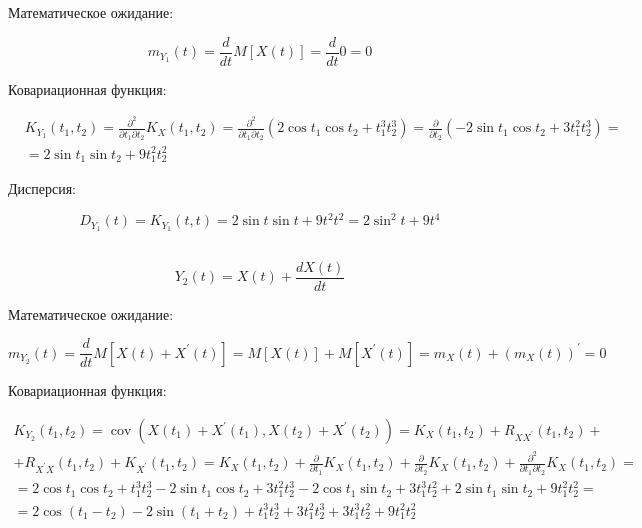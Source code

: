 \documentclass[12 pt]{article}
\begin{document}
Математическое ожидание:

\begin{equation}
	m_{Y_{1}}(t)=\frac{d}{d t} M[X(t)]=\frac{d}{d t} 0=0
\end{equation}


Ковариационная функция:

\begin{align*}
	&K_{Y_{1}}\left(t_{1}, t_{2}\right)=\frac{\partial^{2}}{\partial t_{1} \partial t_{2}} K_{X}\left(t_{1}, t_{2}\right)=\frac{\partial^{2}}{\partial t_{1} \partial t_{2}}\left(2 \cos t_{1} \cos t_{2}+t_{1}^{3} t_{2}^{3}\right)=\frac{\partial}{\partial t_{2}}\left(-2 \sin t_{1} \cos t_{2}+3 t_{1}^{2} t_{2}^{3}\right)= \\
	&=2 \sin t_{1} \sin t_{2}+9 t_{1}^{2} t_{2}^{2}
\end{align*}


Дисперсия:

\begin{equation}
	D_{Y_{1}}(t)=K_{Y_{1}}(t, t)=2 \operatorname{sin}t\operatorname{sin}t+9 t^{2} t^{2}=2 \sin ^{2} t+9 t^{4}
\end{equation}


\newpage
\subsection{}

\begin{equation}
	Y_2(t) = X(t) + \frac{dX(t)}{dt}
\end{equation}

Математическое ожидание:

\begin{equation}
	m_{Y_{2}}(t)=\frac{d}{d t} M\left[X(t)+X^{\prime}(t)\right]=M[X(t)]+M\left[X^{\prime}(t)\right]=m_{X}(t)+\left(m_{X}(t)\right)^{\prime}=0
\end{equation}


Ковариационная функция:

\begin{equation}
	\begin{array}{l}
	K_{Y_{2}}\left(t_{1}, t_{2}\right)=\operatorname{cov}\left(X\left(t_{1}\right)+X^{\prime}\left(t_{1}\right), X\left(t_{2}\right)+X^{\prime}\left(t_{2}\right)\right)=K_{X}\left(t_{1}, t_{2}\right)+R_{X X^{\prime}}\left(t_{1}, t_{2}\right)+ \\
	+R_{X^{\prime} X}\left(t_{1}, t_{2}\right)+K_{X^{\prime}}\left(t_{1}, t_{2}\right)=K_{X}\left(t_{1}, t_{2}\right)+\frac{\partial}{\partial t_{1}} K_{X}\left(t_{1}, t_{2}\right)+\frac{\partial}{\partial t_{2}} K_{X}\left(t_{1}, t_{2}\right)+\frac{\partial^{2}}{\partial t_{1} \partial t_{2}} K_{X}\left(t_{1}, t_{2}\right)= \\
	=2 \cos t_{1} \cos t_{2}+t_{1}^{3} t_{2}^{3}-2 \sin t_{1} \cos t_{2}+3 t_{1}^{2} t_{2}^{3}-2 \cos t_{1} \sin t_{2}+3 t_{1}^{3} t_{2}^{2}+2 \sin t_{1} \sin t_{2}+9 t_{1}^{2} t_{2}^{2}= \\
	=2 \cos \left(t_{1}-t_{2}\right)-2 \sin \left(t_{1}+t_{2}\right)+t_{1}^{3} t_{2}^{3}+3 t_{1}^{2} t_{2}^{3}+3 t_{1}^{3} t_{2}^{2}+9 t_{1}^{2} t_{2}^{2}
	\end{array}
\end{equation}
\end{document}
